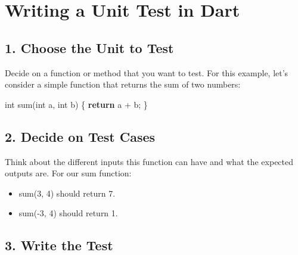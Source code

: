 \documentclass[
]{article}
\newenvironment{Shaded}{\begin{snugshade}}{\end{snugshade}}
\newcommand{\DataTypeTok}[1]{\textcolor[rgb]{0.16,0.50,0.73}{#1}}
\newcommand{\KeywordTok}[1]{\textcolor[rgb]{0.81,0.81,0.76}{\textbf{#1}}}
\newcommand{\NormalTok}[1]{\textcolor[rgb]{0.81,0.81,0.76}{#1}}
\newcommand{\OperatorTok}[1]{\textcolor[rgb]{0.81,0.81,0.76}{#1}}
\providecommand{\tightlist}{%
  \setlength{\itemsep}{0pt}\setlength{\parskip}{0pt}}
\begin{document}
\section{Writing a Unit Test in Dart}\label{writing-a-unit-test-in-dart}

\subsection{1. Choose the Unit to Test}\label{choose-the-unit-to-test}

Decide on a function or method that you want to test. For this example,
let's consider a simple function that returns the sum of two numbers:

\begin{Shaded}
\begin{Highlighting}[]
\DataTypeTok{int}\NormalTok{ sum(}\DataTypeTok{int}\NormalTok{ a}\OperatorTok{,} \DataTypeTok{int}\NormalTok{ b) }\OperatorTok{\{}
  \KeywordTok{return}\NormalTok{ a }\OperatorTok{+}\NormalTok{ b;}
\OperatorTok{\}}
\end{Highlighting}
\end{Shaded}

\subsection{2. Decide on Test Cases}\label{decide-on-test-cases}

Think about the different inputs this function can have and what the
expected outputs are. For our sum function:

\begin{itemize}
\tightlist
\item
  sum(3, 4) should return 7.
\item
  sum(-3, 4) should return 1.
\end{itemize}

\subsection{3. Write the Test}\label{write-the-test}
\end{document}
